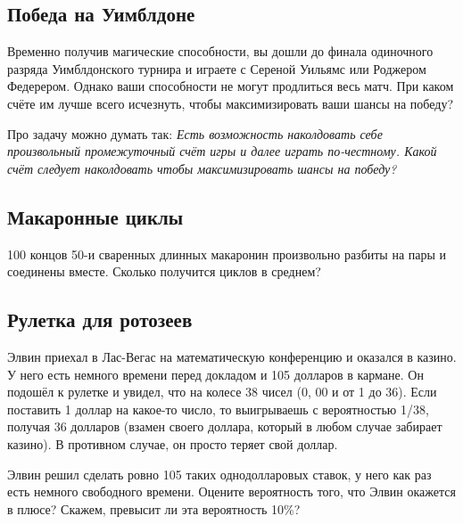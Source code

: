 \subsection*{Победа на Уимблдоне}

Временно получив магические способности, вы дошли до финала одиночного разряда Уимблдонского турнира и играете с Сереной Уильямс или Роджером Федерером.
Однако ваши способности не могут продлиться весь матч.
При каком счёте им лучше всего исчезнуть, чтобы максимизировать ваши шансы на победу?

\begin{addedbytheeditors}
Про задачу можно думать так: 
\textit{Есть возможность наколдовать себе произвольный промежуточный счёт игры и далее играть по-честному.
Какой счёт следует наколдовать чтобы максимизировать шансы на победу?}
\end{addedbytheeditors}



\subsection*{Макаронные циклы}

100 концов 50-и сваренных длинных макаронин произвольно разбиты на пары и соединены вместе.
Сколько получится циклов в среднем?

\subsection*{Рулетка для ротозеев}\label{Рулетка для ротозеев}

Элвин приехал в Лас-Вегас на математическую конференцию и оказался в казино.
У него есть немного времени перед докладом и 105 долларов в кармане.
Он подошёл к рулетке и увидел, что на колесе 38 чисел (0, 00 и от 1 до 36).
Если поставить 1 доллар на какое-то число, то выигрываешь с вероятностью 1/38, получая 36 долларов (взамен своего доллара, который в любом случае забирает казино).
В противном случае, он просто теряет свой доллар.

Элвин решил сделать ровно 105 таких однодолларовых ставок, 
у него как раз есть немного свободного времени.
Оцените вероятность того, что Элвин окажется в плюсе?
Скажем, превысит ли эта вероятность 10\%?
